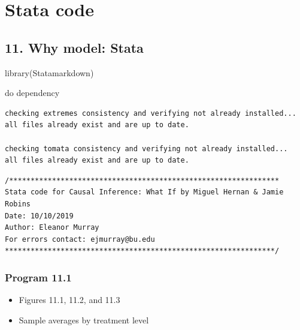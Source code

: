 \documentclass[
  10pt,
  a4paper,
]{book}
\newenvironment{Shaded}{\begin{snugshade}}{\end{snugshade}}
\newcommand{\FunctionTok}[1]{\textcolor[rgb]{0.28,0.35,0.67}{#1}}
\newcommand{\KeywordTok}[1]{\textcolor[rgb]{0.00,0.46,0.62}{#1}}
\newcommand{\NormalTok}[1]{\textcolor[rgb]{0.00,0.46,0.62}{#1}}
\providecommand{\tightlist}{%
  \setlength{\itemsep}{0pt}\setlength{\parskip}{0pt}}
\begin{document}
\part*{Stata code}\label{part-stata-code}

\chapter*{11. Why model: Stata}\label{why-model-stata}

\begin{Shaded}
\begin{Highlighting}[]
\FunctionTok{library}\NormalTok{(Statamarkdown)}
\end{Highlighting}
\end{Shaded}

\begin{Shaded}
\begin{Highlighting}[]
\KeywordTok{do}\NormalTok{ dependency}
\end{Highlighting}
\end{Shaded}

\begin{verbatim}
checking extremes consistency and verifying not already installed...
all files already exist and are up to date.

checking tomata consistency and verifying not already installed...
all files already exist and are up to date.
\end{verbatim}

\begin{verbatim}
/***************************************************************
Stata code for Causal Inference: What If by Miguel Hernan & Jamie Robins
Date: 10/10/2019
Author: Eleanor Murray 
For errors contact: ejmurray@bu.edu
***************************************************************/
\end{verbatim}

\section{Program 11.1}\label{program-11.1-1}

\begin{itemize}
\tightlist
\item
  Figures 11.1, 11.2, and 11.3
\item
  Sample averages by treatment level
\end{itemize}
\end{document}
